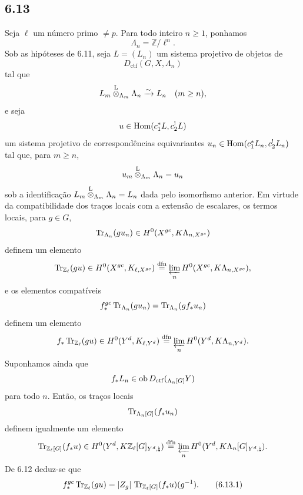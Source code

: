 \subsection*{6.13}
Seja $\ell$ um número primo $\ne p$. Para todo inteiro $n\ge1$, ponhamos
\[
\Lambda_n=\mathbb Z/\ell^n.
\]
Sob as hipóteses de 6.11, seja $L=(L_n)$ um sistema projetivo de objetos de
\[
D_{\mathrm{ctf}}(G,X,\Lambda_n)
\]
tal que
\[
L_m\overset{\mathrm L}{\otimes}_{\Lambda_m}\Lambda_n\xrightarrow{\sim}L_n\quad (m\ge n),
\]
e seja
\[
u\in\operatorname{Hom}(c_1^*L,c_2^!L)
\]
um sistema projetivo de correspondências equivariantes $u_n\in\operatorname{Hom}(c_1^*L_n,c_2^!L_n)$ tal que, para $m\ge n$,
\[
u_m\overset{\mathrm L}{\otimes}_{\Lambda_m}\Lambda_n=u_n
\]
sob a identificação $L_m\overset{\mathrm L}{\otimes}_{\Lambda_m}\Lambda_n=L_n$ dada pelo isomorfismo anterior. Em virtude da compatibilidade dos traços locais com a extensão de escalares, os termos locais, para $g\in G$,
\[
\operatorname{Tr}_{\Lambda_n}(gu_n)\in H^0(X^{gc},K\Lambda_{n,X^{gc}})
\]
definem um elemento
\[
\operatorname{Tr}_{\mathbb Z_{\ell}}(gu)\in
H^0(X^{gc},K_{\ell,X^{gc}})
\stackrel{\mathrm{dfn}}{=}
\varprojlim_n H^0(X^{gc},K\Lambda_{n,X^{gc}}),
\]
e os elementos compatíveis
\[
f_*^{gc}\operatorname{Tr}_{\Lambda_n}(gu_n)=\operatorname{Tr}_{\Lambda_n}(gf_*u_n)
\]
definem um elemento
\[
f_*\operatorname{Tr}_{\mathbb Z_{\ell}}(gu)\in
H^0(Y^d,K_{\ell,Y^d})
\stackrel{\mathrm{dfn}}{=}
\varprojlim_n H^0(Y^d,K\Lambda_{n,Y^d}).
\]
Suponhamos ainda que
\[
f_*L_n\in\operatorname{ob} D_{\mathrm{ctf}}({}_{\Lambda_n[G]}Y)
\]
para todo $n$. Então, os traços locais
\[
\operatorname{Tr}_{\Lambda_n[G]}(f_*u_n)
\]
definem igualmente um elemento
\[
\operatorname{Tr}_{\mathbb Z_{\ell}[G]}(f_*u)\in
H^0(Y^d,K\mathbb Z_{\ell}[G]_{Y^d,\natural})
\stackrel{\mathrm{dfn}}{=}
\varprojlim_n H^0(Y^d,K\Lambda_n[G]_{Y^d,\natural}).
\]
De 6.12 deduz-se que
\begin{equation}
f_*^{gc}\operatorname{Tr}_{\mathbb Z_{\ell}}(gu)
=
|Z_g|\,\operatorname{Tr}_{\mathbb Z_{\ell}[G]}(f_*u)(g^{-1}).
\tag{6.13.1}
\end{equation}
